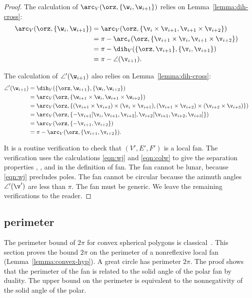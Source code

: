 \begin{proof}
The calculation of $\arc_V(\orz,\{\w_i,\w_{i+1}\})$ relies on
 Lemma~\ref{lemma:dih-cross}:
\begin{align*}
\arc_V(\orz,\{\w_i,\w_{i+1}\}) 
&= \arc_V(\orz,\{\v_i\times\v_{i+1},\v_{i+1}\times \v_{i+2}\}) \\
&=\pi - \arc_v(\orz,\{\v_{i+1}\times\v_i,\v_{i+1}\times\v_{i+2}\})\\
&=\pi - \dih_V(\{\orz,\v_{i+1}\},\{\v_i,\v_{i+1}\})\\
&=\pi - \angle(\v_{i+1}).
\end{align*}

The calculation of $\angle'(\w_{i+1})$ also relies on Lemma~\ref{lemma:dih-cross}:
\begin{align*}
\angle'(\w_{i+1}) 
&= \dih_V(\{\orz,\w_{i+1}\},\{\w_i,\w_{i+2}\}) \\
&= \arc_V (\orz,\{\w_{i+1}\times \w_{i},\w_{i+1}\times \w_{i+2}\})\\
&=\arc_V(\orz,\{ (\v_{i+1}\times \v_{i+2}) \times (\v_i\times \v_{i+1}),
   (\v_{i+1}\times \v_{i+2}) \times (\v_{i+2}\times \v_{i+3}) \})\\
&= \arc_V(\orz,\{ - \v_{i+1} [\v_i,\v_{i+1},\v_{i+2}], 
   \v_{i+2} [\v_{i+1},\v_{i+2},\v_{i+3}]\})\\
&=\arc_V(\orz,\{-\v_{i+1},\v_{i+2}\})\\
&=\pi -\arc_V(\orz,\{\v_{i+1},\v_{i+2}\}).
\end{align*}

It is a routine verification to check that $(V',E',F')$ is a local
fan.  The verification uses the calculations \eqref{eqn:wj} and
\eqref{eqn:colw} to give the separation properties ,
, and  in the definition of fan.
The fan cannot be lunar, because \eqref{eqn:wj} precludes poles.
The fan cannot be circular because the azimuth angles $\angle'(\v')$
are less than $\pi$.  The fan must be generic.
We leave the remaining verifications  to the reader.
\end{proof}


\subsection{perimeter}

The perimeter bound of $2\pi$ for convex spherical polygons is
classical~\cite[p.~100]{vanderWaerden:1951}.   This
section proves the bound $2\pi$ on the perimeter of a nonreflexive
local fan (Lemma~\ref{lemma:convex-hyp}).  A great circle has
perimeter $2\pi$.  The proof shows that the perimeter of the
fan is related to the solid angle of the polar fan by duality.
The upper bound on the perimeter is equivalent to the nonnegativity
of the solid angle of the polar.

